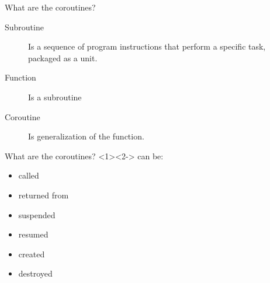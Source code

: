 \documentclass[10pt]{beamer}
\begin{document}
\begin{frame}{What are the coroutines?}
\vfill

\begin{description}
	\item [Subroutine] Is a sequence of program instructions that perform a specific task, packaged as a unit.
	\item [Function] Is a subroutine
	\item [Coroutine] Is generalization of the function.
\end{description}

\vfill
\end{frame}

\begin{frame}{What are the coroutines?}
	\alert{<2->} can be:
	\begin{itemize}
		\item called
		\item returned from
		\item<2-|alert@2> \alert<+>{suspended}
		\item<3-|alert@3> resumed
		\item<4-|alert@4> created
		\item<5-|alert@5> destroyed
	\end{itemize}
\end{frame}
\end{document}
